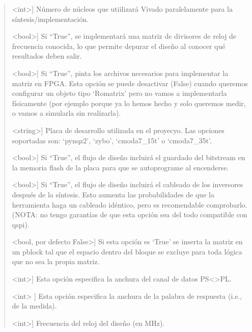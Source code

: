 \documentclass[letterpaper,10pt,english]{sphinxmanual}
\begin{document}
\begin{fulllineitems}
\begin{fulllineitems}
\begin{quote}
\begin{description}
\sphinxlineitem{njobs}{[}\textless{}int\textgreater{}{]}
\sphinxAtStartPar
Número de núcleos que utiilizará Vivado paralelamente para la 
síntesis/implementación.

\sphinxlineitem{debug}{[}\textless{}bool\textgreater{}{]}
\sphinxAtStartPar
Si “True”, se implementará una matriz de divisores de reloj de 
frecuencia conocida, lo que permite depurar el diseño al conocer
qué resultados deben salir.

\sphinxlineitem{files}{[}\textless{}bool\textgreater{}{]}
\sphinxAtStartPar
Si “True”, pinta los archivos necesarios para implementar la 
matriz en FPGA. Esta opción se puede desactivar (False) cuando 
queremos configurar un objeto tipo ‘Romatrix’ pero no vamos a 
implementarla físicamente (por ejemplo porque ya lo hemos hecho
y solo queremos medir, o vamos a simularla sin realizarla).

\sphinxlineitem{board}{[}\textless{}string\textgreater{}{]}
\sphinxAtStartPar
Placa de desarrollo utilizada en el proyecyo. Las opciones 
soportadas son: ‘pynqz2’, ‘zybo’, ‘cmoda7\_15t’ o ‘cmoda7\_35t’.

\sphinxlineitem{qspi}{[}\textless{}bool\textgreater{}{]}
\sphinxAtStartPar
Si “True”, el flujo de diseño incluirá el guardado del bitstream
en la memoria flash de la placa para que se auto\sphinxhyphen{}programe al 
encenderse.

\sphinxlineitem{routing}{[}\textless{}bool\textgreater{}{]}
\sphinxAtStartPar
Si “True”, el flujo de diseño incluirá el cableado de los 
inversores después de la síntesis. Esto aumenta las 
probabilidades de que la herramienta haga un cableado idéntico,
pero es recomendable comprobarlo. (NOTA: no tengo garantías de 
que esta opción sea del todo compatible con \sphinxhyphen{}qspi).

\sphinxlineitem{pblock}{[}\textless{}bool, por defecto False\textgreater{}{]}
\sphinxAtStartPar
Si esta opción es ‘True’ se inserta la matriz en un pblock tal que
el espacio dentro del bloque se excluye para toda lógica que no sea
la propia matriz.

\sphinxlineitem{data\_width(dw)}{[}\textless{}int\textgreater{}{]}
\sphinxAtStartPar
Esta opción especifica la anchura del canal de datos PS\textless{}\textendash{}\textgreater{}PL.

\sphinxlineitem{buffer\_out\_width(bow)}{[}\textless{}int\textgreater{} {]}
\sphinxAtStartPar
Esta opción especifica la anchura de la palabra de respuesta 
(i.e., de la medida).

\sphinxlineitem{f\_clock}{[}\textless{}int\textgreater{}{]}
\sphinxAtStartPar
Frecuencia del reloj del diseño (en MHz).


\end{description}
\end{quote}
\end{fulllineitems}
\end{fulllineitems}
\end{document}
